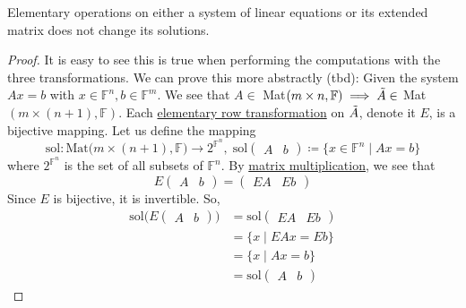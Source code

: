   \begin{theorem}
    \label{thm:elementary-operations-preserve-the-solution-set}
    Elementary operations on either a system of linear equations or its extended matrix does not change its solutions. 
  \end{theorem}
  \begin{proof}
    It is easy to see this is true when performing the computations with the three transformations. We can prove this more abstractly (tbd): Given the system $A x = b$ with $x \in \mathbb{F}^n, b \in \mathbb{F}^m$. We see that $A \in $ Mat$(m \times n, \mathbb{F}) \implies \Tilde{A} \in$ Mat$(m \times (n+1), \mathbb{F})$. Each \hyperref[def:elementary-row-transformation]{elementary row transformation} on $\Tilde{A}$, denote it $E$, is a bijective mapping. Let us define the mapping 
    \begin{equation}
      \text{sol}: \text{Mat}\big( m \times (n+1), \mathbb{F} \big) \to 2^{\mathbb{F}^n}, \; \text{sol} \begin{pmatrix}
      A & b
      \end{pmatrix} \coloneqq \{ x\in \mathbb{F}^n \; | \; A x = b\} 
    \end{equation}
    where $2^{\mathbb{F}^n}$ is the set of all subsets of $\mathbb{F}^n$. By \hyperref[def:matrix-multiplication]{matrix multiplication}, we see that 
    \begin{equation}
       E \begin{pmatrix}
      A & b
      \end{pmatrix} = \begin{pmatrix}
      E A & E b
      \end{pmatrix}
    \end{equation}
    Since $E$ is bijective, it is invertible. So, 
    \begin{align} 
      \text{sol} \big( E \begin{pmatrix}
      A & b \end{pmatrix} \big) & = \text{sol} \begin{pmatrix}
      E A & E b \end{pmatrix} \\ 
      & = \{ x \mid E A x = E b\} \\ 
      & = \{ x \mid A x = b\} \\ 
      & = \text{sol} \begin{pmatrix} A & b \end{pmatrix}
    \end{align}
  \end{proof}

